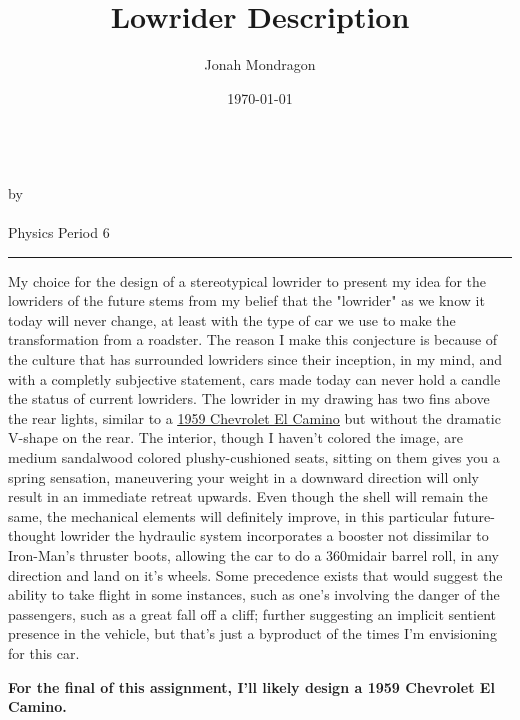 \documentclass[12pt]{article}
\newcommand{\PutTitle}[1]
{
    \begin{center}
        {\huge\bfseries\thetitle}\\
        by \theauthor\\
        \thedate\\
        #1        
    \end{center}
    \hrule
    \vspace{2ex}
}
\begin{document}
\doublespacing

\title{Lowrider Description}
\author{Jonah Mondragon}
\date{\today}

\PutTitle{Physics Period 6}

My choice for the design of a stereotypical lowrider to present my idea for the lowriders of the future
    stems from my belief that the "lowrider" as we know it today will never change, at least with the
    type of car we use to make the transformation from a roadster. 
    The reason I make this conjecture is because of the culture that has surrounded lowriders since 
    their inception, in my mind, and with a completly subjective statement, cars made today can never 
    hold a candle the status of current lowriders.
    The lowrider in my drawing has two fins above the rear lights, similar to a
    {\color{blue}\underline{\href{http://cascadiaclassics.com/home/2018/1/20/1959-chevrolet-el-camino}{1959 Chevrolet El Camino}}}
    but without the dramatic V-shape on the rear.
The interior, though I haven't colored the image, are medium sandalwood colored plushy-cushioned seats,
    sitting on them gives you a spring sensation, maneuvering your weight in a downward direction will
    only result in an immediate retreat upwards.
Even though the shell will remain the same, the mechanical elements will definitely improve, in this
    particular future-thought lowrider the hydraulic system incorporates a booster not dissimilar to
    Iron-Man's thruster boots, allowing the car to do a 360\textdegree midair barrel roll, in any 
    direction and land on it's wheels.
Some precedence exists that would suggest the ability to take flight in some instances, such as one's
    involving the danger of the passengers, such as a great fall off a cliff; further suggesting an
    implicit sentient presence in the vehicle, but that's just a byproduct of the times I'm envisioning
    for this car.

\begin{center}
    \textbf{For the final of this assignment, I'll likely design a 1959 Chevrolet El Camino.}
\end{center}
\end{document}
